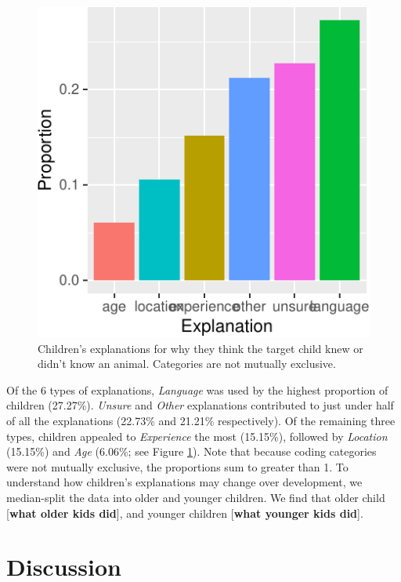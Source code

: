 \documentclass[10pt, letterpaper]{article}
\newenvironment{CodeChunk}{}{}
\begin{document}
\begin{CodeChunk}
\begin{figure}[tb]
\includegraphics{figs/explanations-1} \caption[Children's explanations for why they think the target child knew or didn't know an animal]{Children's explanations for why they think the target child knew or didn't know an animal. Categories are not mutually exclusive.}\label{fig:explanations}
\end{figure}
\end{CodeChunk}

Of the 6 types of explanations, \emph{Language} was used by the highest
proportion of children (27.27\%). \emph{Unsure} and \emph{Other}
explanations contributed to just under half of all the explanations
(22.73\% and 21.21\% respectively). Of the remaining three types,
children appealed to \emph{Experience} the most (15.15\%), followed by
\emph{Location} (15.15\%) and \emph{Age} (6.06\%; see Figure
\ref{fig:explanations}). Note that because coding categories were not
mutually exclusive, the proportions sum to greater than 1. To understand
how children's explanations may change over development, we median-split
the data into older and younger children. We find that older child
{[}\textbf{what older kids did}{]}, and younger children {[}\textbf{what
younger kids did}{]}.

\hypertarget{discussion}{%
\section{Discussion}\label{discussion}}
\end{document}
